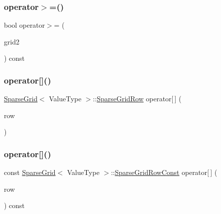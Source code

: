 \subsubsection{\texorpdfstring{operator$>$=()}{operator>=()}}
{\footnotesize\ttfamily bool operator$>$= (\begin{DoxyParamCaption}\item[{const \mbox{\hyperlink{classSparseGrid}{Sparse\+Grid}}$<$ Value\+Type $>$ \&}]{grid2 }\end{DoxyParamCaption}) const}

\mbox{\label{classSparseGrid_aa9fc713bc20f40c89e4b3a86a4583fb9}} 
\subsubsection{\texorpdfstring{operator[]()}{operator[]()}\hspace{0.1cm}{\footnotesize\ttfamily [1/4]}}
{\footnotesize\ttfamily \mbox{\hyperlink{classSparseGrid}{Sparse\+Grid}}$<$ Value\+Type $>$\+::\mbox{\hyperlink{classSparseGrid_1_1SparseGridRow}{Sparse\+Grid\+Row}} operator\mbox{[}$\,$\mbox{]} (\begin{DoxyParamCaption}\item[{int}]{row }\end{DoxyParamCaption})}

\mbox{\label{classSparseGrid_a269741238689cf035ad12e8cff38844f}} 
\subsubsection{\texorpdfstring{operator[]()}{operator[]()}\hspace{0.1cm}{\footnotesize\ttfamily [2/4]}}
{\footnotesize\ttfamily const \mbox{\hyperlink{classSparseGrid}{Sparse\+Grid}}$<$ Value\+Type $>$\+::\mbox{\hyperlink{classSparseGrid_1_1SparseGridRowConst}{Sparse\+Grid\+Row\+Const}} operator\mbox{[}$\,$\mbox{]} (\begin{DoxyParamCaption}\item[{int}]{row }\end{DoxyParamCaption}) const}

